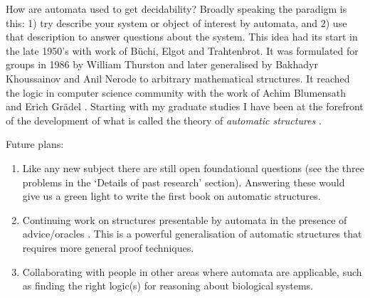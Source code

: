 \documentclass[12pt]{article}
\theoremstyle{plain} \numberwithin{equation}{section}
\theoremstyle{definition}
\begin{document}
How are automata used to get decidability? Broadly speaking the paradigm is this: 1) try describe your system or object of interest by automata, and 2) use that description to answer questions about the system. This idea had its start in the late 1950's with work of B\"uchi, Elgot and Trahtenbrot. It was formulated for groups in 1986 by William Thurston \cite{CEHLPT92} and later generalised by Bakhadyr Khoussainov and Anil Nerode \cite{KhNe95} to arbitrary mathematical structures.
It reached the logic in computer science community with the work of Achim Blumensath and Erich Gr\"adel \cite{BLGr02}. Starting with my graduate studies  I have been at the forefront of the development of what is called the theory of {\em automatic structures} \cite{Rubi04} \cite{Rubi08}.





Future plans:
\begin{enumerate}
\item 
Like any new subject there are still open foundational questions (see the three problems in the `Details of past research' section). Answering these would give us a green light to write the first book on automatic structures.

\item Continuing work on structures presentable by automata in the presence of advice/oracles \cite{CoLo06} \cite{KRSZ} \cite{BKRa}. This is a powerful generalisation of automatic structures that requires more general proof techniques.
\item Collaborating with people in other areas where automata are applicable, such as finding the right logic(s) for reasoning about biological systems.
\end{enumerate}
\end{document}
